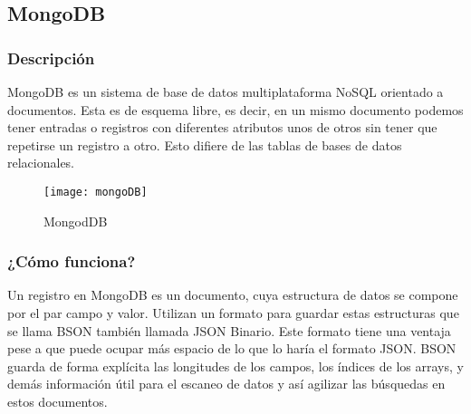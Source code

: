 

\subsection{MongoDB}

\subsubsection{ Descripción }

MongoDB  \cite{URL::MongoDB} es un sistema de base de datos multiplataforma NoSQL   \cite{URL::NoSQL} orientado a documentos. Esta es de esquema libre, es decir, en un mismo documento podemos tener entradas o registros con diferentes atributos unos de otros sin tener que repetirse un registro a otro. Esto difiere de las tablas de bases de datos relacionales.

    
\begin{figure}[h]
    \centering
    \texttt{[image: mongoDB]}
    \caption{ MongodDB }
    \label{fig:mongoDB}
\end{figure}

\subsubsection{ ¿Cómo funciona? }

Un registro en MongoDB es un documento, cuya estructura de datos se compone por el par campo y valor. Utilizan un formato para guardar estas estructuras que se llama BSON  \cite{URL::BSON} también llamada JSON Binario. Este formato tiene una ventaja pese a que puede ocupar más espacio de lo que lo haría el formato JSON. BSON guarda de forma explícita las longitudes de los campos, los índices de los arrays, y demás información útil para el escaneo de datos y así agilizar las búsquedas en estos documentos.

